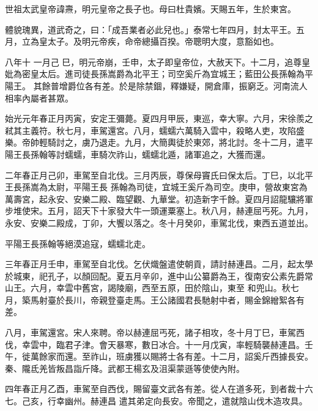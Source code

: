 
\begin{pinyinscope}

 世祖太武皇帝諱燾，明元皇帝之長子也。母曰杜貴嬪。天賜五年，生於東宮。



 體貌瑰異，道武奇之，曰：「成吾業者必此兒也。」泰常七年四月，封太平王。五月，立為皇太子。及明元帝疾，命帝總攝百揆。帝聰明大度，意豁如也。



 八年十
 一月己
 巳，明元帝崩，壬申，太子即皇帝位，大赦天下。十二月，追尊皇妣為密皇太后。進司徒長孫嵩爵為北平王；司空奚斤為宜城王；藍田公長孫翰為平陽王。
 其餘普增爵位各有差。於是除禁錮，釋嫌疑，開倉庫，振窮乏。河南流人相率內屬者甚眾。



 始光元年春正月丙寅，安定王彌薨。夏四月甲辰，東巡，幸大寧。六月，宋徐羨之弒其主義符。秋七月，車駕還宮。八月，蠕蠕六萬騎入雲中，殺略人吏，攻陷盛樂。帝帥輕騎討之，虜乃退走。九月，大簡輿徒於東郊，將北討。冬十二月，遣平陽王長孫翰等討蠕蠕，車騎次祚山，蠕蠕北遁，諸軍追之，大獲而還。



 二年春正月己卯，車駕至自北伐。三月丙辰，尊保母竇氏曰保太后。丁巳，以北平王長孫嵩為太尉，平陽王長
 孫翰為司徒，宜城王奚斤為司空。庚申，營故東宮為萬壽宮，起永安、安樂二殿、臨望觀、九華堂。初造新字千餘。夏四月詔龍驤將軍步堆使宋。五月，詔天下十家發大牛一頭運粟塞上。秋八月，赫連屈丐死。九月，永安、安樂二殿成，丁卯，大饗以落之。冬十月癸卯，車駕北伐，東西五道並出。



 平陽王長孫翰等絕漠追寇，蠕蠕北走。



 三年春正月壬申，車駕至自北伐。乞伏熾盤遣使朝貢，請討赫連昌。二月，起太學於城東，祀孔子，以顏回配。夏五月辛卯，進中山公纂爵為王，復南安公素先爵常山王。六月，幸雲中舊宮，謁陵廟，西至五原，田於陰山，東至
 和兜山。秋七月，築馬射臺於長川，帝親登臺走馬。王公諸國君長馳射中者，賜金錦繒絮各有差。



 八月，車駕還宮。宋人來聘。帝以赫連屈丐死，諸子相攻，冬十月丁巳，車駕西伐，幸雲中，臨君子津。會天暴寒，數日冰合。十一月戊寅，率輕騎襲赫連昌。壬午，徙萬餘家而還。至祚山，班虜獲以賜將士各有差。十二月，詔奚斤西據長安。秦、隴氐羌皆叛昌詣斤降。武都王楊玄及沮渠蒙遜等使使內附。



 四年春正月乙酉，車駕至自西伐，賜留臺文武各有差。從人在道多死，到者裁十六七。己亥，行幸幽州。赫連昌
 遣其弟定向長安。帝聞之，遣就陰山伐木造攻具。




\end{pinyinscope}
